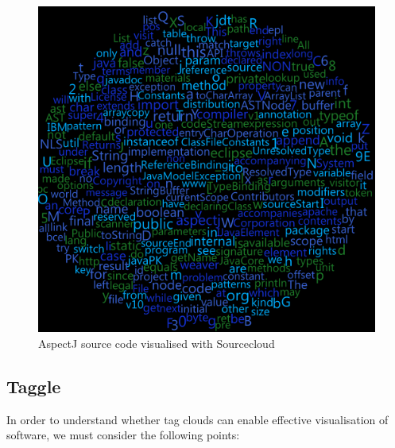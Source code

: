\begin{figure}[h!]
   	\centering
  	\includegraphics[width=140mm]{sourcecloud.png}	
	\caption{AspectJ source code visualised with Sourcecloud}
	\label{fig:sourcecloud}
\end{figure}




\subsection{Taggle}

In order to understand whether tag clouds can enable effective visualisation of software, we must consider the following points:

